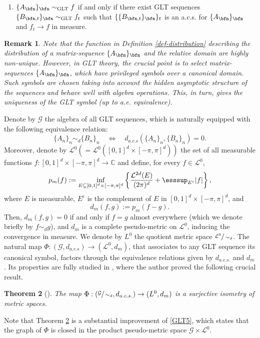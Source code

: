 \documentclass{amsart}
\newtheorem{thm}{Theorem}[section]
\newtheorem{rem}[thm]{Remark}
\newcommand{\R}{\mathbb{R}}
\begin{document}
\begin{enumerate}[label=\textbf{GLT \arabic*}]
    \item \label{GLT5} $\{A_{\bfn}\}_{\bfn} \sim_{\text{GLT}} f$ if and only if there exist GLT sequences $\{B_{\bfn,t}\}_{\bfn} \sim_{\text{GLT}} f_t$ such that $\{\{B_{\bfn,t}\}_{\bfn}\}_t$ is an a.c.s. for $\{A_{\bfn}\}_{\bfn}$ and $f_t \to f$ in measure.
\end{enumerate}

\begin{rem}
    Note that the function in Definition \ref{def-distribution} describing the distribution of a matrix-sequence $\{A_\bfn\}_\bfn$ and the relative domain are highly non-unique. However, in GLT theory, the crucial point is to select matrix-sequences $\{A_\bfn\}_\bfn$, which have privileged symbols over a canonical domain. Such symbols are chosen taking into account the hidden asymptotic structure of the sequences and behave well with algebra operations. This, in turn, gives the uniqueness of the GLT symbol (up to a.e. equivalence).
\end{rem}
    Denote by $\mathcal{G}$ the algebra of all GLT sequences, which is naturally equipped with the following equivalence relation:
    \begin{equation*}
        \{A_n\}_n\sim_d\{B_n\}_n\quad\iff\quad d_{a.c.s}(\{A_n\}_n,\{B_n\}_n)=0.
    \end{equation*} 
    Moreover, denote by $\mathcal{L}^0(=\mathcal{L}^0([0,1]^d\times[-\pi,\pi]^d))$ the set of all measurable functions $f:[0,1]^d\times[-\pi,\pi]^d\to\mathbb{C}$ and define, for every $f \in \mathcal{L}^0$,
    \begin{equation*}
        p_m(f):=\inf\limits_{E\subseteq [0,1]^d\times[-\pi,\pi]^d}\left\{\frac{\mathcal{L}^{2d}(E)}{(2\pi)^d}+\esssup_{E^c}|f|\right\},
    \end{equation*}
    where $E$ is measurable, $E^c$ is the complement of $E$ in $[0,1]^d \times [-\pi,\pi]^d$, and
    \begin{equation*}
    d_m(f,g):=p_m(f-g).
    \end{equation*}
    Then, $d_m(f,g)=0$ if and only if $f=g$ almost everywhere (which we denote briefly by $f\sim_d g$), and $d_m$ is a complete pseudo-metric on $\mathcal{L}^0$, inducing the convergence in measure. We denote by $L^0$ the quotient metric space $\sfrac{\mathcal{L}^0}{\sim_d}$.
    The natural map $\Phi:(\mathcal{G},d_{a.c.s})\to(\mathcal{L}^0,d_m)$, that associates to any GLT sequence its canonical symbol, factors through the equivalence relations given by $d_{a.c.s.}$ and $d_m$. Its properties are fully studied in \cite{Barb17}, where the author proved the following crucial result.
    \begin{thm}[\cite{Barb17}]\label{equiv_GLT_meas}
        The map $\Phi:(\sfrac{\mathcal{G}}{\sim_d},d_{a.c.s.})\to(L^0,d_m)$ is a surjective isometry of metric spaces.
    \end{thm}
    Note that Theorem \ref{equiv_GLT_meas} is a substantial improvement of \eqref{GLT5}, which states that the graph of $\Phi$ is closed in the product pseudo-metric space $\mathcal{G}\times\mathcal{L}^0$.
    
\end{document}
